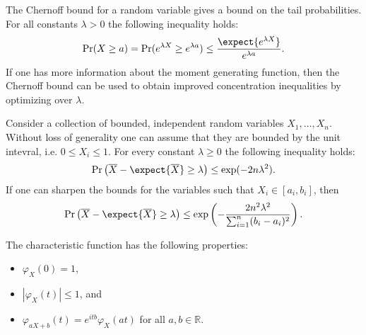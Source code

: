     \begin{method}
        The Chernoff bound for a random variable gives a bound on the tail probabilities. For all constants $\lambda>0$ the following inequality holds:
        \begin{gather}
            \mathrm{Pr}(X\geq a)=\mathrm{Pr}(e^{\lambda X}\geq e^{\lambda a})\leq\frac{\expect{e^{\lambda X}}}{e^{\lambda a}}.
        \end{gather}
        If one has more information about the moment generating function, then the Chernoff bound can be used to obtain improved concentration inequalities by optimizing over $\lambda$.
    \end{method}
    \begin{property}\label{prob:hoeffding_inequality}
        Consider a collection of bounded, independent random variables $X_1,\ldots,X_n$. Without loss of generality one can assume that they are bounded by the unit intevral, i.e. $0\leq X_i\leq 1$. For every constant $\lambda\geq0$ the following inequality holds:
        \begin{gather}
            \mathrm{Pr}\left(\overline{X}-\expect{\overline{X}}\geq\lambda\right)\leq\exp(-2n\lambda^2).
        \end{gather}
        If one can sharpen the bounds for the variables such that $X_i\in[a_i,b_i]$, then
        \begin{gather}
            \mathrm{Pr}\left(\overline{X}-\expect{\overline{X}}\geq\lambda\right)\leq\exp\left(-\frac{2n^2\lambda^2}{\sum_{i=1}^n(b_i-a_i)^2}\right).
        \end{gather}
    \end{property}

    \begin{property}\label{prob:characteristic_function_properties}
        The characteristic function has the following properties:
        \begin{itemize}
            \item $\varphi_X(0) = 1$,
            \item $|\varphi_X(t)| \leq 1$, and
            \item $\varphi_{aX+b}(t) = e^{itb}\varphi_X(at)$ for all $a,b\in\mathbb{R}$.
        \end{itemize}
    \end{property}

